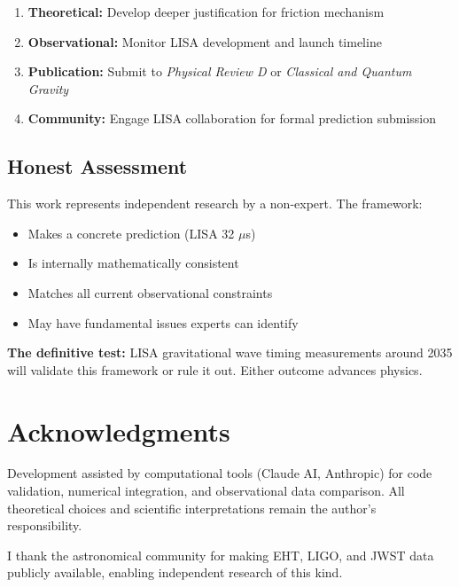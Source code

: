 \documentclass[12pt]{article}
\begin{document}
\begin{enumerate}
    \item \textbf{Theoretical:} Develop deeper justification for friction mechanism
    \item \textbf{Observational:} Monitor LISA development and launch timeline
    \item \textbf{Publication:} Submit to \emph{Physical Review D} or \emph{Classical and Quantum Gravity}
    \item \textbf{Community:} Engage LISA collaboration for formal prediction submission
\end{enumerate}

\subsection{Honest Assessment}

This work represents independent research by a non-expert. The framework:
\begin{itemize}
    \item Makes a concrete prediction (LISA 32 $\mu$s)
    \item Is internally mathematically consistent
    \item Matches all current observational constraints
    \item May have fundamental issues experts can identify
\end{itemize}

\textbf{The definitive test:} LISA gravitational wave timing measurements around 2035 will validate this framework or rule it out. Either outcome advances physics.

\section*{Acknowledgments}

Development assisted by computational tools (Claude AI, Anthropic) for code validation, numerical integration, and observational data comparison. All theoretical choices and scientific interpretations remain the author's responsibility.

I thank the astronomical community for making EHT, LIGO, and JWST data publicly available, enabling independent research of this kind.
\end{document}
